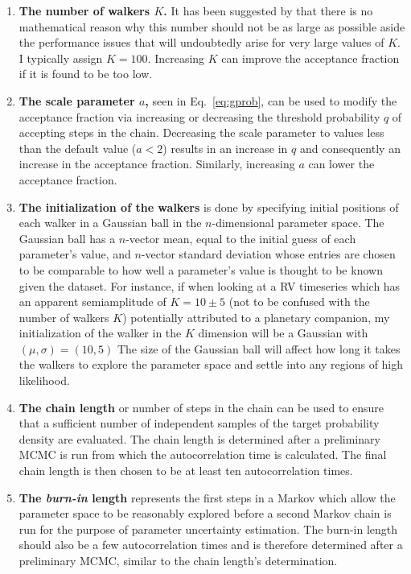 \begin{enumerate}
\item \textbf{The number of walkers $K$.} It has been 
suggested by \cite{foremanmackey13} that there is no mathematical reason why this number should 
not be as large as possible aside the performance issues that will undoubtedly arise for very 
large values of $K$. I typically 
assign $K=100$. Increasing $K$ can improve the acceptance fraction if it is found to be 
too low. 
\item \textbf{The scale parameter $a$,} 
seen in Eq.~\ref{eq:gprob}, can be used to modify the acceptance fraction 
via increasing or decreasing the threshold probability $q$ of accepting steps in the chain. 
Decreasing the scale parameter to values less than the default value ($a<2$) results in an increase 
in $q$ and consequently an increase in the acceptance fraction. Similarly, increasing $a$ can lower 
the acceptance fraction.
\item \textbf{The initialization of the walkers} is done by specifying initial positions of each 
walker in a Gaussian ball in the $n$-dimensional parameter space. The Gaussian ball has a $n$-vector 
mean, equal to the initial guess of each parameter's value, and $n$-vector standard deviation 
whose entries are chosen to be comparable to how well a parameter's value is thought to be known 
given the dataset. 
For instance, if when looking at a RV timeseries which has an apparent semiamplitude of 
$K = 10 \pm 5$ \mps{} (not to be confused with the number of walkers $K$) potentially attributed to a 
planetary companion, my initialization of the walker in the $K$ dimension will be a Gaussian with 
$(\mu, \sigma)=(10,5)$  The size of the Gaussian ball will affect how long it takes the walkers 
to explore the parameter space and settle into any regions of high likelihood.
\item \textbf{The chain length} or number of steps in the chain can be used to ensure that a sufficient 
number of independent samples of the target probability density are evaluated. The chain length is 
determined 
after a preliminary MCMC is run from which the autocorrelation time is calculated. The final chain 
length is then chosen to be at least ten autocorrelation times.
\item \textbf{The \emph{burn-in} length} represents the first steps in a Markov which allow the 
parameter space to be reasonably explored before a second Markov chain is run for the purpose of 
parameter uncertainty estimation. The burn-in 
length should also be a few autocorrelation times and is 
therefore determined after a preliminary MCMC, similar to the chain length's determination. 
\end{enumerate}


